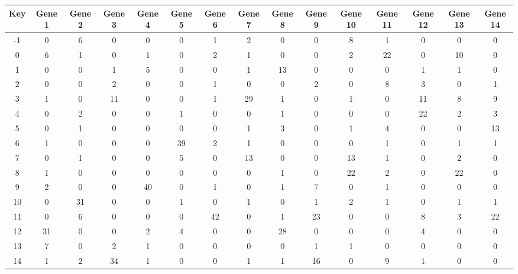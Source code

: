 \begin{tabular}{|c|c|c|c|c|c|c|c|c|c|c|c|c|c|c|}
\hline
Key & Gene 1 & Gene 2 & Gene 3 & Gene 4 & Gene 5 & Gene 6 & Gene 7 & Gene 8 & Gene 9 & Gene 10 & Gene 11 & Gene 12 & Gene 13 & Gene 14 \\
\hline
-1 & 0 & 6 & 0 & 0 & 0 & 1 & 2 & 0 & 0 & 8 & 1 & 0 & 0 & 0 \\
0 & 6 & 1 & 0 & 1 & 0 & 2 & 1 & 0 & 0 & 2 & 22 & 0 & 10 & 0 \\
1 & 0 & 0 & 1 & 5 & 0 & 0 & 1 & 13 & 0 & 0 & 0 & 1 & 1 & 0 \\
2 & 0 & 0 & 2 & 0 & 0 & 1 & 0 & 0 & 2 & 0 & 8 & 3 & 0 & 1 \\
3 & 1 & 0 & 11 & 0 & 0 & 1 & 29 & 1 & 0 & 1 & 0 & 11 & 8 & 9 \\
4 & 0 & 2 & 0 & 0 & 1 & 0 & 0 & 1 & 0 & 0 & 0 & 22 & 2 & 3 \\
5 & 0 & 1 & 0 & 0 & 0 & 0 & 1 & 3 & 0 & 1 & 4 & 0 & 0 & 13 \\
6 & 1 & 0 & 0 & 0 & 39 & 2 & 1 & 0 & 0 & 0 & 1 & 0 & 1 & 1 \\
7 & 0 & 1 & 0 & 0 & 5 & 0 & 13 & 0 & 0 & 13 & 1 & 0 & 2 & 0 \\
8 & 1 & 0 & 0 & 0 & 0 & 0 & 0 & 1 & 0 & 22 & 2 & 0 & 22 & 0 \\
9 & 2 & 0 & 0 & 40 & 0 & 1 & 0 & 1 & 7 & 0 & 1 & 0 & 0 & 0 \\
10 & 0 & 31 & 0 & 0 & 1 & 0 & 1 & 0 & 1 & 2 & 1 & 0 & 1 & 1 \\
11 & 0 & 6 & 0 & 0 & 0 & 42 & 0 & 1 & 23 & 0 & 0 & 8 & 3 & 22 \\
12 & 31 & 0 & 0 & 2 & 4 & 0 & 0 & 28 & 0 & 0 & 0 & 4 & 0 & 0 \\
13 & 7 & 0 & 2 & 1 & 0 & 0 & 0 & 0 & 1 & 1 & 0 & 0 & 0 & 0 \\
14 & 1 & 2 & 34 & 1 & 0 & 0 & 1 & 1 & 16 & 0 & 9 & 1 & 0 & 0 \\
\hline
\end{tabular}